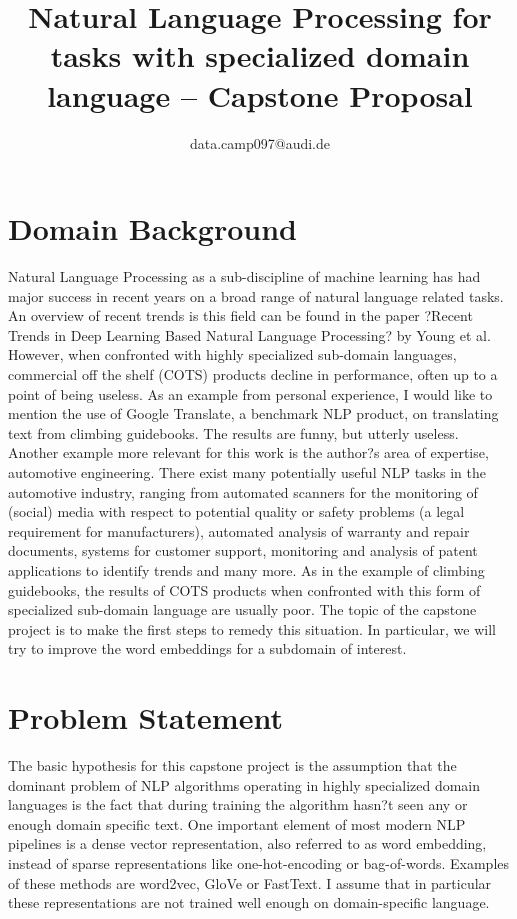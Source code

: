 \documentclass[10pt,a4paper]{article}
\begin{document}
	\title{Natural Language Processing for tasks with specialized domain language  --  Capstone Proposal}
	\author{data.camp097@audi.de}
	\maketitle
	
	\section{Domain Background}
	Natural Language Processing as a sub-discipline of machine learning has had major success in recent years on a broad range of natural language related tasks. An overview of recent trends is this field can be found in the paper ?Recent Trends in Deep Learning Based
	Natural Language Processing? by Young et al. 
	However, when confronted with highly specialized sub-domain languages, commercial off the shelf (COTS) products decline in performance, often up to a point of being useless. As an example from personal experience, I would like to mention the use of Google Translate, a benchmark NLP product, on translating text from climbing guidebooks. The results are funny, but utterly useless.
	Another example more relevant for this work is the author?s area of expertise, automotive engineering. There exist many potentially useful NLP tasks in the automotive industry, ranging from automated scanners for the monitoring of (social) media with respect to potential quality or safety problems (a legal requirement for manufacturers), automated analysis of warranty and repair documents, systems for customer support, monitoring and analysis of patent applications to identify trends and many more.
	As in the example of climbing guidebooks, the results of COTS products when confronted with this form of specialized sub-domain language are usually poor. 
	The topic of the capstone project is to make the first steps to remedy this situation. In particular, we will try to improve the word embeddings for a subdomain of interest.
	
	\section{Problem Statement}
	The basic hypothesis for this capstone project is the assumption that the dominant problem of NLP algorithms operating in highly specialized domain languages is the fact that during training the algorithm hasn?t seen any or enough domain specific text. 
	One important element of most modern NLP pipelines is a dense vector representation, also referred to as word embedding, instead of sparse representations like one-hot-encoding or bag-of-words. Examples of these methods are word2vec, GloVe or FastText. I assume that in particular these representations are not trained well enough on domain-specific language. 
	
\end{document}

